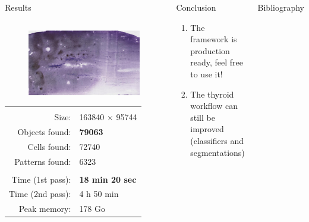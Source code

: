 \documentclass{beamer}
\begin{document}
\begin{frame}
\begin{columns}[t]
\begin{exampleblock}{Results}
\begin{columns}
		\begin{column}{0.48\linewidth}
			\begin{figure}
				\center
				\includegraphics[scale=0.35]{images/716528.png}
			\end{figure}
			
			\begin{tabular}{rl}
				& \\
				Size: & 163840 $\times$ 95744 \\
				Objects found: & \textbf{79063} \\
				Cells found: & 72740 \\
				Patterns found: & 6323 \\
				& \\
				Time (1st pass): & \textbf{18 min 20 sec} \\
				Time (2nd pass): & 4 h 50 min  \\
				Peak memory: & 178 Go \\
			\end{tabular}
		\end{column}
	\end{columns}
\end{exampleblock}
\vfill

\begin{alertblock}{Conclusion}
\begin{enumerate}
	\item The framework is production ready, feel free to use it! 
	\item The thyroid workflow can still be improved (classifiers and segmentations)
\end{enumerate}
\end{alertblock}
\begin{block}{Bibliography}
\printbibliography
\end{block}

\end{columns}
\end{frame}
\end{document}
